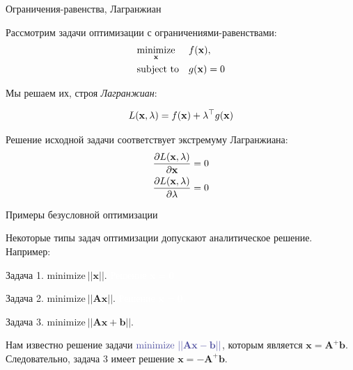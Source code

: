 \documentclass{beamer}
\begin{document}
\begin{frame}{Ограничения-равенства, Лагранжиан}
	\begin{flushleft}
		
		Рассмотрим задачи оптимизации с ограничениями-равенствами:
		\begin{equation}
			\begin{aligned}
				& \underset{\mathbf{x}}{\text{minimize}}
				& & f(\mathbf{x}), \\
				& \text{subject to}
				& & g(\mathbf{x}) = 0
			\end{aligned}
		\end{equation}
		
		Мы решаем их, строя \emph{Лагранжиан}:
		
		\begin{equation}
			L(\mathbf{x}, \lambda) = f(\mathbf{x}) + \lambda^\top g(\mathbf{x})
		\end{equation}
		
		Решение исходной задачи соответствует экстремуму Лагранжиана:
		\begin{align}
			\frac{\partial L(\mathbf{x}, \lambda)}{\partial \mathbf{x}} = 0
			\\
			\frac{\partial L(\mathbf{x}, \lambda)}{\partial \lambda} = 0
		\end{align}
		
	\end{flushleft}
\end{frame}



\begin{frame}{Примеры безусловной оптимизации}
	\begin{flushleft}
		
		
		Некоторые типы задач оптимизации допускают аналитическое решение. Например:
		
		
		Задача 1. $\text{minimize} \ ||\mathbf{x}||$. \textcolor{white}{Решение $\mathbf{x} = \mathbf{0}$} 
		
		\bigskip
		
		Задача 2. $\text{minimize} \ ||\mathbf{A}\mathbf{x}||$. \textcolor{white}{Решение $\mathbf{x} = \mathbf{0}$.}
		
		\bigskip
		
		Задача 3. $\text{minimize} \ ||\mathbf{A}\mathbf{x} + \mathbf{b}||$. 
		
		\bigskip
		
		Нам известно решение задачи $\textcolor{mydarkgray}{\text{minimize} \ ||\mathbf{A}\mathbf{x} - \mathbf{b}||}$, которым является $\mathbf{x} = \mathbf{A}^+ \mathbf{b}$. Следовательно, задача 3 имеет решение $\mathbf{x} = -\mathbf{A}^+ \mathbf{b}$.
		
	\end{flushleft}
\end{frame}
\end{document}
